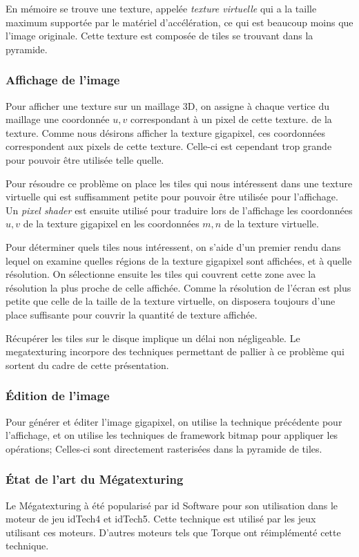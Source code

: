 		En mémoire se trouve une texture, appelée \emph{texture virtuelle} qui a la taille maximum supportée par le matériel d'accélération, 
		ce qui est beaucoup moins que l'image originale. Cette texture est composée de tiles se trouvant dans la pyramide.
		
		\subsubsection{Affichage de l'image}
			Pour afficher une texture sur un maillage 3D, on assigne à chaque vertice  du maillage une coordonnée $u,v$ correspondant à un pixel de cette texture.
			de la texture. Comme nous désirons afficher la texture gigapixel, ces coordonnées correspondent aux pixels de cette texture.
			Celle-ci est cependant trop grande pour pouvoir être utilisée telle quelle.
			
			Pour résoudre ce problème on place les tiles qui nous intéressent dans une texture virtuelle qui est suffisamment petite pour pouvoir
			être utilisée pour l'affichage. Un \emph{pixel shader} est ensuite utilisé pour traduire lors de l'affichage les coordonnées $u,v$ de la
			texture gigapixel en les coordonnées $m,n$ de la texture virtuelle. 

			Pour déterminer quels tiles nous intéressent, on s'aide d'un premier rendu dans lequel on examine quelles régions de la texture gigapixel
			sont affichées, et à quelle résolution. On sélectionne ensuite les tiles qui couvrent cette zone avec la résolution la plus proche de celle
			affichée. Comme la résolution de l'écran est plus petite que celle de la taille de la texture virtuelle, on disposera toujours d'une place
			suffisante pour couvrir la quantité de texture affichée.

			Récupérer les tiles sur le disque implique un délai non négligeable. Le megatexturing incorpore des techniques permettant de pallier à
			ce problème qui sortent du cadre de cette présentation.

		\subsubsection{Édition de l'image}
			Pour générer et éditer l'image gigapixel, on utilise la technique précédente pour l'affichage, et on utilise les techniques de framework 
			bitmap pour appliquer les opérations; Celles-ci sont directement rasterisées dans la pyramide de tiles.
		\subsubsection{État de l'art du Mégatexturing}
			Le Mégatexturing à été popularisé par id Software pour son utilisation dans le moteur de jeu idTech4 et idTech5\cite{megatex1}\cite{megatex2}. Cette technique est utilisé
			par les jeux utilisant ces moteurs. D'autres moteurs tels que Torque ont réimplémenté cette technique.

